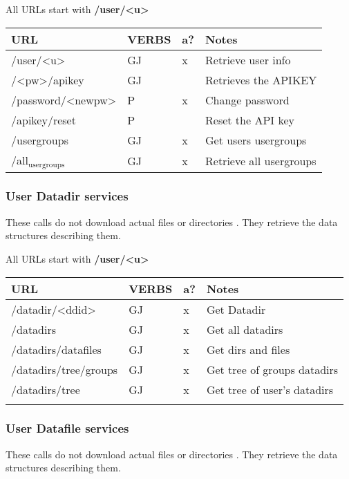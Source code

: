\documentclass[11pt]{article}
\begin{document}
All URLs start with \textbf{/user/<u>}

\begin{center}
\begin{tabular}{llll}
URL & VERBS & a? & Notes\\
\hline
/user/<u> & GJ & x & Retrieve user info\\
/<pw>/apikey & GJ &  & Retrieves the APIKEY\\
/password/<newpw> & P & x & Change password\\
/apikey/reset & P &  & Reset the API key\\
/usergroups & GJ & x & Get users usergroups\\
/all$_{\text{usergroups}}$ & GJ & x & Retrieve all usergroups\\
\end{tabular}
\end{center}

\subsubsection{User Datadir services}
\label{sec-1-1-5}

These calls do not download actual files or directories . They retrieve
the data structures describing them.

All URLs start with \textbf{/user/<u>}

\begin{center}
\begin{tabular}{llll}
URL & VERBS & a? & Notes\\
\hline
/datadir/<ddid> & GJ & x & Get  Datadir\\
/datadirs & GJ & x & Get all datadirs\\
/datadirs/datafiles & GJ & x & Get dirs and files\\
/datadirs/tree/groups & GJ & x & Get tree of groups datadirs\\
/datadirs/tree & GJ & x & Get tree of user's datadirs\\
 &  &  & \\
\end{tabular}
\end{center}
\subsubsection{User Datafile services}
\label{sec-1-1-6}

These calls do not download actual files or directories . They retrieve
the data structures describing them.
\end{document}
